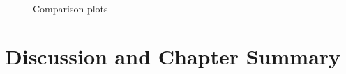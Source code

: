 \begin{figure}[p!]
    \centering
    \caption[Comparison plots (diversification)]{Comparison plots}
    \label{fig:ch9_comparison_ch8_plots}
\end{figure}

\section{Discussion and Chapter Summary}